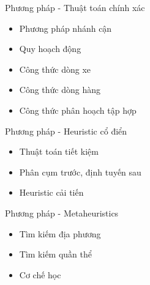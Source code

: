 \begin{frame}{Phương pháp - Thuật toán chính xác}
  \begin{itemize}
    \item Phương pháp nhánh cận
    \item Quy hoạch động
    \item Công thức dòng xe 
    \item Công thức dòng hàng
    \item Công thức phân hoạch tập hợp
  \end{itemize}
\end{frame}

\begin{frame}{Phương pháp - Heuristic cổ điển}
  \begin{itemize}
    \item Thuật toán tiết kiệm
    \item Phân cụm trước, định tuyến sau 
    \item Heuristic cải tiến
  \end{itemize}
\end{frame}

\begin{frame}{Phương pháp - Metaheuristics}
  \begin{itemize}
    \item Tìm kiếm địa phương
    \item Tìm kiếm quần thể 
    \item Cơ chế học
  \end{itemize}
\end{frame}

